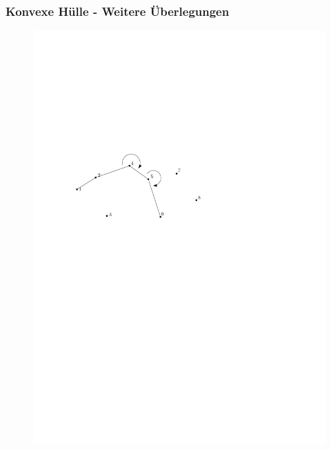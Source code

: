 \begin{frame}
	\frametitle{{Konvexe Hülle - Weitere Überlegungen}}
\begin{figure}[htbp]
	\begin{center}
  	\includegraphics[width=.8\linewidth]{bilder/graham5}
	\end{center}
\end{figure}
\end{frame}


